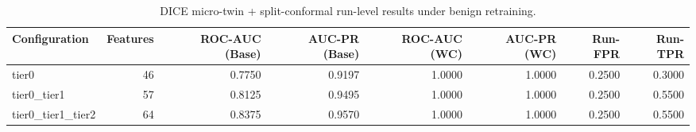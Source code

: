 \begin{table}[t]
\centering
\caption{DICE micro-twin + split-conformal run-level results under benign retraining.}
\label{tab:dice_full_overall}
\footnotesize
\begin{tabular}{lrrrrrrr}
\toprule
Configuration & Features & ROC-AUC (Base) & AUC-PR (Base) & ROC-AUC (WC) & AUC-PR (WC) & Run-FPR & Run-TPR \\
\midrule
tier0 & 46 & 0.7750 & 0.9197 & 1.0000 & 1.0000 & 0.2500 & 0.3000 \\
tier0_tier1 & 57 & 0.8125 & 0.9495 & 1.0000 & 1.0000 & 0.2500 & 0.5500 \\
tier0_tier1_tier2 & 64 & 0.8375 & 0.9570 & 1.0000 & 1.0000 & 0.2500 & 0.5500 \\
\bottomrule
\end{tabular}

\end{table}
